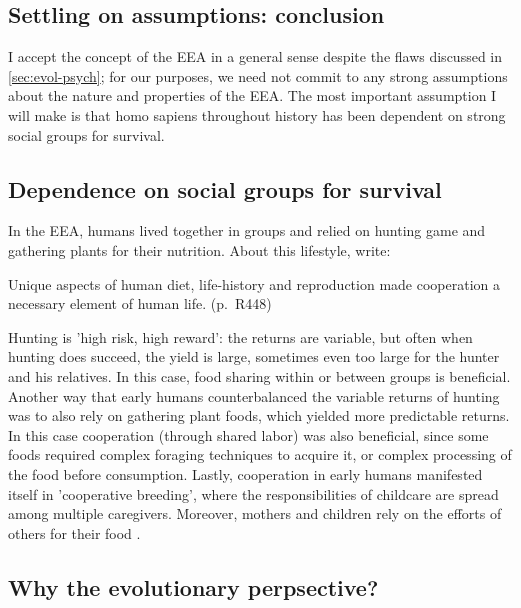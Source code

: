 \subsection{Settling on assumptions: conclusion}


I accept the concept of the EEA in a general sense despite the flaws discussed in \cref{sec:evol-psych}; for our purposes, we need not commit to any strong assumptions about the nature and properties of the EEA. The most important assumption I will make is that homo sapiens throughout history has been dependent on strong social groups for survival.

\subsection{Dependence on social groups for survival}
In the EEA, humans lived together in groups and relied on hunting game and gathering plants for their nutrition.
About this lifestyle, \citet{ApicellaSilk19} write:
\begin{quoting}
    Unique aspects of human diet, life-history and reproduction made cooperation a necessary element of human life.
    \hfill (p.~R448)
\end{quoting}
Hunting is 'high risk, high reward': the returns are variable, but often when hunting does succeed, the yield is large, sometimes even too large for the hunter and his relatives. In this case, food sharing within or between groups is beneficial.
Another way that early humans counterbalanced the variable returns of hunting was to also rely on gathering plant foods, which yielded more predictable returns. In this case cooperation (through shared labor) was also beneficial, since some foods required complex foraging techniques to acquire it, or complex processing of the food before consumption.
Lastly, cooperation in early humans manifested itself in 'cooperative breeding', where the responsibilities of childcare are spread among multiple caregivers. Moreover, mothers and children rely on the efforts of others for their food \citep{ApicellaSilk19}.

\subsection{Why the evolutionary perpsective?}

